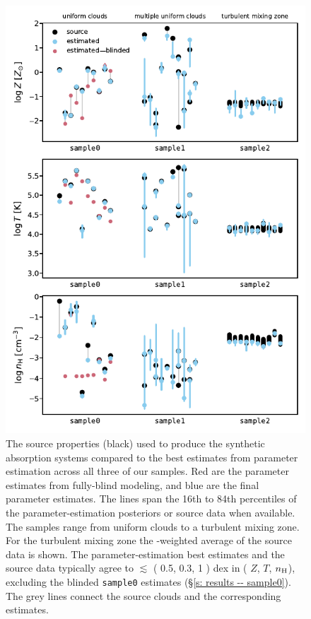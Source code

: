 \documentclass[fleqn,usenatbib]{mnras}
\begin{document}
\begin{figure}
    \centering
    \includegraphics[height=0.9\textheight]{figures/summary.pdf}
    \caption{
    The source properties (black) used to produce the synthetic absorption systems
    compared to the best estimates from parameter estimation across all three of our samples.
    Red are the parameter estimates from fully-blind modeling,
    and blue are the final parameter estimates.
    The lines span the 16th to 84th percentiles of the parameter-estimation posteriors or source data when available.
    The samples range from uniform clouds to a turbulent mixing zone.
    For the turbulent mixing zone the -weighted average of the source data is shown.
    The parameter-estimation best estimates and the source data typically agree to $\lesssim$ ( 0.5, 0.3, 1 ) dex in ( $Z$, $T$, $n_{\rm H}$),
    excluding the blinded \texttt{sample0} estimates (\S\ref{s: results -- sample0}).
    The grey lines connect the source clouds and the corresponding estimates.
    }
    \label{f: summary}
\end{figure}
\end{document}
